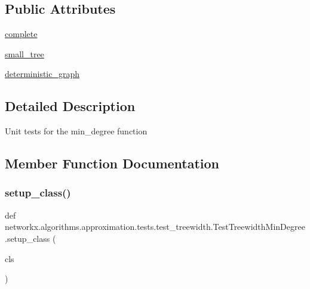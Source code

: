 \subsection*{Public Attributes}
\begin{DoxyCompactItemize}
\item 
\hyperlink{classnetworkx_1_1algorithms_1_1approximation_1_1tests_1_1test__treewidth_1_1TestTreewidthMinDegree_a4a0648ba60605b1b0e7c89f96ded5045}{complete}
\item 
\hyperlink{classnetworkx_1_1algorithms_1_1approximation_1_1tests_1_1test__treewidth_1_1TestTreewidthMinDegree_ad571d1541f9e5158955a623af309fc16}{small\+\_\+tree}
\item 
\hyperlink{classnetworkx_1_1algorithms_1_1approximation_1_1tests_1_1test__treewidth_1_1TestTreewidthMinDegree_af4168eb3fd2cf5df6862ee0aeab4c6d7}{deterministic\+\_\+graph}
\end{DoxyCompactItemize}


\subsection{Detailed Description}
\begin{DoxyVerb}Unit tests for the min_degree function\end{DoxyVerb}
 

\subsection{Member Function Documentation}
\mbox{\label{classnetworkx_1_1algorithms_1_1approximation_1_1tests_1_1test__treewidth_1_1TestTreewidthMinDegree_a59fae7d8605b660221ab7690a6d16981}} 
\subsubsection{\texorpdfstring{setup\+\_\+class()}{setup\_class()}}
{\footnotesize\ttfamily def networkx.\+algorithms.\+approximation.\+tests.\+test\+\_\+treewidth.\+Test\+Treewidth\+Min\+Degree.\+setup\+\_\+class (\begin{DoxyParamCaption}\item[{}]{cls }\end{DoxyParamCaption})}


